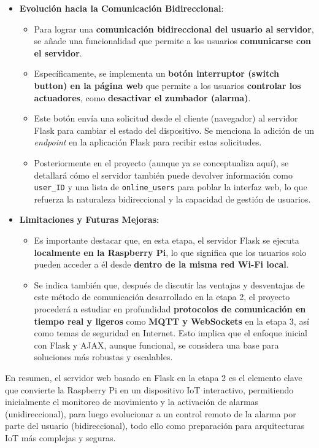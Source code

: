 \documentclass{report}
\begin{document}
\begin{itemize}
    \item \textbf{Evolución hacia la Comunicación Bidireccional}:
    \begin{itemize}
        \item Para lograr una \textbf{comunicación bidireccional del usuario al servidor}, se añade una funcionalidad que permite a los usuarios 
        \textbf{comunicarse con el servidor}.
        \item Específicamente, se implementa un \textbf{botón interruptor (switch button) en la página web} que permite a los usuarios 
        \textbf{controlar los actuadores}, como \textbf{desactivar el zumbador (alarma)}.
        \item Este botón envía una solicitud desde el cliente (navegador) al servidor Flask para cambiar el estado del dispositivo. Se 
        menciona la adición de un \textit{endpoint} en la aplicación Flask para recibir estas solicitudes.
        \item Posteriormente en el proyecto (aunque ya se conceptualiza aquí), se detallará cómo el servidor también puede devolver información 
        como \verb|user_ID| y una lista de \verb|online_users| para poblar la interfaz web, lo que refuerza la naturaleza bidireccional y la capacidad 
        de gestión de usuarios.
    \end{itemize}

    \item \textbf{Limitaciones y Futuras Mejoras}:
    \begin{itemize}
        \item Es importante destacar que, en esta etapa, el servidor Flask se ejecuta \textbf{localmente en la Raspberry Pi}, lo que significa que los 
        usuarios solo pueden acceder a él desde \textbf{dentro de la misma red Wi-Fi local}.
        \item Se indica también que, después de discutir las ventajas y desventajas de este método de comunicación desarrollado en la etapa 2, 
        el proyecto procederá a estudiar en profundidad \textbf{protocolos de comunicación en tiempo real y ligeros} como \textbf{MQTT y WebSockets} en 
        la etapa 3, así como temas de seguridad en Internet. Esto implica que el enfoque inicial con Flask y AJAX, aunque funcional, se considera 
        una base para soluciones más robustas y escalables.
    \end{itemize}
\end{itemize}
En resumen, el servidor web basado en Flask en la etapa 2 es el elemento clave que convierte la Raspberry Pi en un dispositivo IoT interactivo, 
permitiendo inicialmente el monitoreo de movimiento y la activación de alarmas (unidireccional), para luego evolucionar a un control remoto de la 
alarma por parte del usuario (bidireccional), todo ello como preparación para arquitecturas IoT más complejas y seguras.
\end{document}
